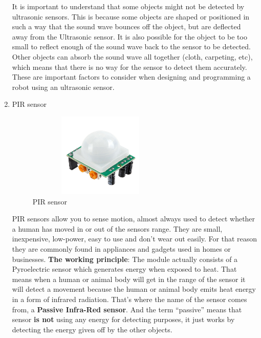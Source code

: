\begin{enumerate}
\begin{figure}[H]
		\end{figure}
		\vspace{0mm}
		It is important to understand that some objects might not be detected by ultrasonic sensors. 
		This is because some objects are shaped or positioned in such a way that the sound wave bounces off the object, but are deflected away from the Ultrasonic sensor. 
		It is also possible for the object to be too small to reflect enough of the sound wave back to the sensor to be detected.
		Other objects can absorb the sound wave all together (cloth, carpeting, etc), which means that there is no way for the sensor to detect them accurately. 
		These are important factors to consider when designing and programming a robot using an ultrasonic sensor.
		
		\item PIR sensor
		 \vspace{0mm}
		 \begin{figure}[H]
		 	\centering
		 	\includegraphics[width=7cm,height=4cm]{figures/PIR}
		 	\caption{PIR sensor}
		 	\label{Fig:PIR sensor}
		 \end{figure}
		 \vspace{0mm}
		 PIR sensors allow you to sense motion, almost always used to detect whether a human has moved in or out of the sensors range. 
		 They are small, inexpensive, low-power, easy to use and don't wear out easily.
		 For that reason they are commonly found in appliances and gadgets used in homes or businesses. 
		 \textbf{The working principle}: The module actually consists of a Pyroelectric sensor which generates energy when exposed to heat.
		 That means when a human or animal body will get in the range of the sensor it will detect a movement because the human or animal body emits heat energy in a form of infrared radiation. That’s where the name of the sensor comes from, a \textbf{Passive Infra-Red sensor}. And the term “passive” means that sensor \textbf{is not} using any energy for detecting purposes, it just works by detecting the energy given off by the other objects.
		 \vspace{0mm}
		 \begin{figure}[H]

\end{figure}
\end{enumerate}
